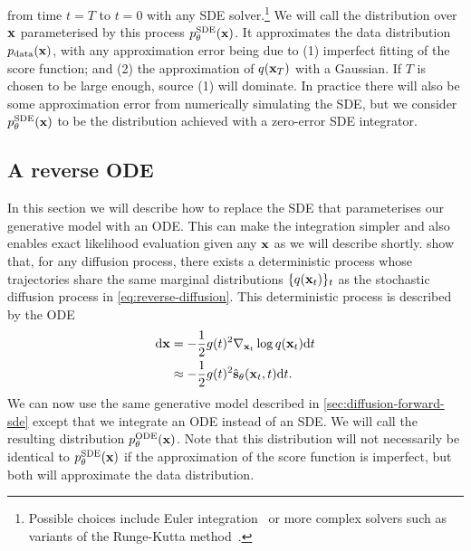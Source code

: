 from time $t=T$ to $t=0$ with any SDE solver.\footnote{Possible choices include Euler integration~\citep{ho2020denoising} or more complex solvers such as variants of the Runge-Kutta method~\citep{debrabant2009families,grathwohl2018ffjord}.} We will call the distribution over ${\mathbf{x}}$ parameterised by this process $p_\theta^\text{SDE}({\mathbf{x}})$. It approximates the data distribution $p_{\rm{data}}({\mathbf{x}})$, with any approximation error being due to (1) imperfect fitting of the score function; and (2) the approximation of $q({\mathbf{x}}_T)$ with a Gaussian. If $T$ is chosen to be large enough, source (1) will dominate. In practice there will also be some approximation error from numerically simulating the SDE, but we consider $p_\theta^\text{SDE}({\mathbf{x}})$ to be the distribution achieved with a zero-error SDE integrator.


\subsection{A reverse ODE} \label{sec:diffusion-ode}
In this section we will describe how to replace the SDE that parameterises our generative model with an ODE. This can make the integration simpler and also enables exact likelihood evaluation given any ${\mathbf{x}}$ as we will describe shortly. \citet{song2020score} show that, for any diffusion process, there exists a deterministic process whose trajectories share the same marginal distributions $\{q({\mathbf{x}}_t)\}_t$ as the stochastic diffusion process in \cref{eq:reverse-diffusion}. This deterministic process is described by the ODE
\begin{align}
    \mathrm{d}{\mathbf{x}} &= - \frac{1}{2} g(t)^2 \nabla_{{\mathbf{x}}_t} \log q({\mathbf{x}}_t) \mathrm{d}t \label{eq:diffusion-ode} \\
    &\approx - \frac{1}{2} g(t)^2 \hat{{\mathbf{s}}}_\theta({\mathbf{x}}_t, t) \mathrm{d}t. \label{eq:diffusion-ode-with-nn}
\end{align}
We can now use the same generative model described in \cref{sec:diffusion-forward-sde} except that we integrate an ODE instead of an SDE. We will call the resulting distribution $p_\theta^\text{ODE}({\mathbf{x}})$. Note that this distribution will not necessarily be identical to $p_\theta^\text{SDE}({\mathbf{x}})$ if the approximation of the score function is imperfect, but both will approximate the data distribution.

